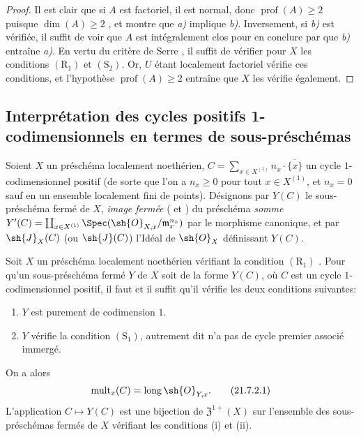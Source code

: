 \begin{proof}
Il est clair que si $A$ est factoriel, il est normal, donc $\operatorname{prof}(A)\geq2$ puisque $\dim(A)\geq2$ , et  montre que \emph{a)} implique \emph{b)}.
Inversement, si \emph{b)} est vérifiée, il suffit de voir que $A$ est intégralement clos pour en conclure par  que \emph{b)} entraîne \emph{a)}.
En vertu du critère de Serre , il suffit de vérifier pour $X$ les conditions $(\mathrm{R}_1)$ et $(\mathrm{S}_2)$.
Or, $U$ étant localement factoriel vérifie ces conditions, et l'hypothèse $\operatorname{prof}(A)\geq2$ entraîne que $X$ les vérifie également.
\end{proof}
\subsection{Interprétation des cycles positifs 1-codimensionnels en termes de sous-préschémas}
\label{subsection:IV.21.7}
\label{IV.21.7}

\begin{env}[21.7.1]
\label{IV.21.7.1}
Soient $X$ un préschéma localement noethérien, $C=\sum_{x\in X^{(1)}}n_x\cdot\overline{\{x\}}$ un cycle $1$-codimensionnel positif (de sorte que l'on a $n_x\geq0$ pour tout $x\in X^{(1)}$, et $n_x=0$ sauf en un ensemble localement fini de points).
Désignons par $Y(C)$ le sous-préschéma fermé de $X$, \emph{image fermée} ( et ) du préschéma \emph{somme} $Y'(C)=\coprod_{x\in X^{(1)}}\Spec(\sh{O}_{X,x}/\mathfrak{m}_x^{n_x})$ par le morphisme canonique, et par $\sh{J}_X(C)$ (ou $\sh{J}(C)$) l'Idéal de $\sh{O}_X$ définissant $Y(C)$.
\end{env}

\begin{proposition}[21.7.2]
\label{IV.21.7.2}
Soit $X$ un préschéma localement noethérien vérifiant la condition $(\mathrm{R}_1)$ .
Pour qu'un sous-préschéma fermé $Y$ de $X$ soit de la forme $Y(C)$, où $C$ est un cycle $1$-codimensionnel positif, il faut et il suffit qu'il vérifie les deux conditions suivantes:
\begin{enumerate}[label=(\roman*)]
  \item $Y$ est purement de codimension $1$.
  \item $Y$ vérifie la condition $(\mathrm{S}_1)$, autrement dit  n'a pas de cycle premier associé immergé.
\end{enumerate}
On a alors
\[
\label{IV.21.7.2.1}
  \operatorname{mult}_x(C)=\operatorname{long}\sh{O}_{Y,x}.
  \tag{21.7.2.1}
\]
L'application $C\mapsto Y(C)$ est une bijection de $\mathfrak{Z}^{1+}(X)$ sur l'ensemble des sous-préschémas fermés de $X$ vérifiant les conditions (i) et (ii).
\end{proposition}


